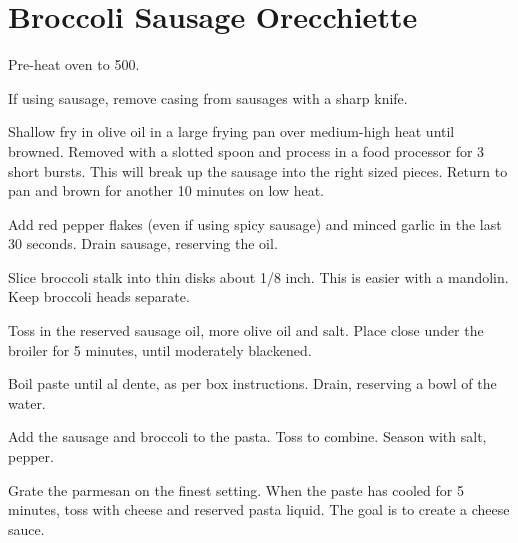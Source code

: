 \section{Broccoli Sausage Orecchiette}
\begin{recipe}



Pre-heat oven to 500\degree{}.

If using sausage, remove casing from sausages with a sharp knife.

Shallow fry in olive oil in a large frying pan over medium-high heat until
browned. Removed with a slotted spoon and process in a food processor for 3 short bursts. This will break up the sausage into the right sized pieces. Return to pan and brown for another 10 minutes on low heat.

Add red pepper flakes (even if using spicy sausage) and minced garlic in the last 30 seconds. Drain sausage, reserving the oil.


Slice broccoli stalk into thin disks about 1/8 inch. This is easier with a mandolin. Keep broccoli heads separate.

Toss in the reserved sausage oil, more olive oil and salt. Place close under the broiler for 5 minutes, until moderately blackened.


Boil paste until al dente, as per box instructions. Drain, reserving a bowl of the water.

Add the sausage and broccoli to the pasta. Toss to combine. Season with salt, pepper.


Grate the parmesan on the finest setting. When the paste has cooled for 5 minutes, toss with cheese and reserved pasta liquid. The goal is to create a cheese sauce.


\end{recipe}
